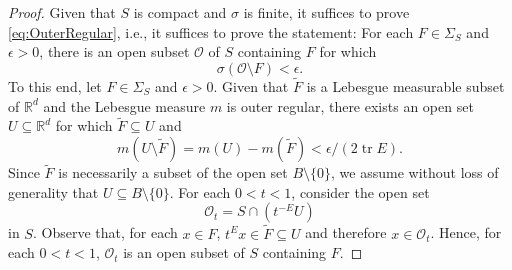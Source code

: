 \documentclass[11pt]{article}
\theoremstyle{theorem}
\newcommand\tr{\operatorname{tr}}
\begin{document}
\begin{proof}
Given that $S$ is compact and $\sigma$ is finite, it suffices to prove \eqref{eq:OuterRegular}, i.e., it suffices to prove the statement: For each $F\in \Sigma_S$ and $\epsilon>0$, there is an open subset $\mathcal{O}$ of $S$ containing $F$ for which 
\begin{equation*}
\sigma(\mathcal{O}\setminus F)<\epsilon.
\end{equation*}
To this end, let $F\in \Sigma_S$ and $\epsilon>0$. Given that $\widetilde{F}$ is a Lebesgue measurable subset of $\mathbb{R}^d$ and the Lebesgue measure $m$ is outer regular, there exists an open set $U\subseteq \mathbb{R}^d$ for which $\widetilde{F}\subseteq U$ and
\begin{equation}\label{eq:LebesgueOuter}
m(U\setminus \widetilde{F})=m(U)-m(\widetilde{F})<\epsilon/(2\tr E).
\end{equation}
Since $\widetilde{F}$ is necessarily a subset of the open set $B\setminus\{0\}$, we assume without loss of generality that $U\subseteq B\setminus\{0\}$.
For each $0<t<1$, consider the open set
\begin{equation*}
\mathcal{O}_t=S\cap\left( t^{-E}U\right)
\end{equation*}
in $S$. Observe that, for each $x\in F$, $t^E x\in \widetilde{F}\subseteq U$ and therefore $x\in \mathcal{O}_t$. Hence, for each $0<t<1$, $\mathcal{O}_t$ is an open subset of $S$ containing $F$. 


\end{proof}
\end{document}
